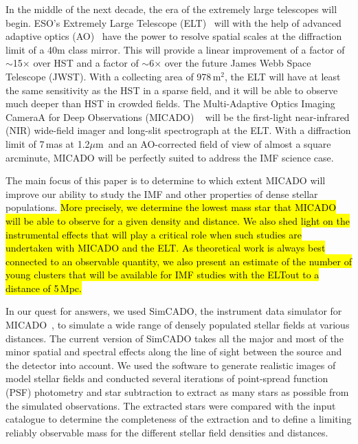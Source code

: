 \documentclass{aa}
\newcommand{\um}{$\mu$m~}
\newcommand{\s}{$\sim$}
\newcommand{\h}[1]{$^{#1}$}
\begin{document}
In the middle of the next decade, the era of the extremely large telescopes will begin.
ESO's Extremely Large Telescope (ELT)~\citep{eelt} will with the help of advanced adaptive optics (AO)~\citep{maory} have the power to resolve spatial scales at the diffraction limit of a 40m class mirror.
This will provide a linear improvement of a factor of \s15$\times$ over HST and a factor of \s6$\times$ over the future James Webb Space Telescope (JWST).
With a collecting area of 978\,m\h2, the ELT will have at least the same sensitivity as the HST in a sparse field, and it will be able to observe much deeper than HST in crowded fields.
The Multi-Adaptive Optics Imaging CameraA for Deep Observations (MICADO) ~\citep{micado2016, micado2018} will be the first-light near-infrared (NIR) wide-field imager and long-slit spectrograph at the ELT\@.
With a diffraction limit of 7\,mas at 1.2\um and an AO-corrected field of view of almost a square arcminute, MICADO will be perfectly suited to address the IMF science case.

The main focus of this paper is to determine to which extent MICADO will improve our ability to study the IMF and other properties of dense stellar populations.
\hl{More precisely, we determine the lowest mass star that MICADO will be able to observe for a given density and distance.
We also shed light on the instrumental effects that will play a critical role when such studies are undertaken with MICADO and the ELT.
As theoretical work is always best connected to an observable quantity, we also present an estimate of the number of young clusters that will be available for IMF studies with the ELT\@ out to a distance of 5\,Mpc.}

In our quest for answers, we used SimCADO, the instrument data simulator for MICADO~\citep{leschinski2016, leschinski19}, to simulate a wide range of densely populated stellar fields at various distances.
The current version of SimCADO takes all the major and most of the minor spatial and spectral effects along the line of sight between the source and the detector into account.
We used the software to generate realistic images of model stellar fields and  conducted several iterations of point-spread function (PSF) photometry and star subtraction to extract as many stars as possible from the simulated observations.
The extracted stars were compared with the input catalogue to determine the completeness of the extraction and to define a limiting reliably observable mass for the different stellar field densities and distances.
\end{document}
